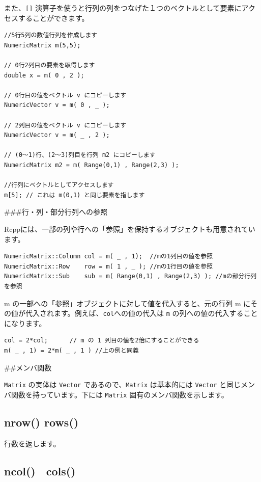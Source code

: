 \documentclass[]{book}
\begin{document}
また、\texttt{{[}{]}} 演算子を使うと行列の列をつなげた１つのベクトルとして要素にアクセスすることができます。

\begin{verbatim}
//5行5列の数値行列を作成します
NumericMatrix m(5,5);

// 0行2列目の要素を取得します
double x = m( 0 , 2 );

// 0行目の値をベクトル v にコピーします
NumericVector v = m( 0 , _ );

// 2列目の値をベクトル v にコピーします
NumericVector v = m( _ , 2 );

// (0〜1)行、(2〜3)列目を行列 m2 にコピーします
NumericMatrix m2 = m( Range(0,1) , Range(2,3) );

//行列にベクトルとしてアクセスします
m[5]; // これは m(0,1) と同じ要素を指します
\end{verbatim}

\#\#\#行・列・部分行列への参照

Rcppには、一部の列や行への「参照」を保持するオブジェクトも用意されています。

\begin{verbatim}
NumericMatrix::Column col = m( _ , 1);  //mの1列目の値を参照
NumericMatrix::Row    row = m( 1 , _ ); //mの1行目の値を参照
NumericMatrix::Sub    sub = m( Range(0,1) , Range(2,3) ); //mの部分行列を参照
\end{verbatim}

m の一部への「参照」オブジェクトに対して値を代入すると、元の行列 m にその値が代入されます。例えば、\texttt{col}への値の代入は \texttt{m} の列への値の代入することになります。

\begin{verbatim}
col = 2*col;      // m の 1 列目の値を2倍にすることができる
m( _ , 1) = 2*m( _ , 1 ) //上の例と同義
\end{verbatim}

\#\#メンバ関数

\texttt{Matrix} の実体は \texttt{Vector} であるので、\texttt{Matrix} は基本的には \texttt{Vector} と同じメンバ関数を持っています。下には \texttt{Matrix} 固有のメンバ関数を示します。

\hypertarget{nrow-rows}{%
\subsection{nrow() rows()}\label{nrow-rows}}

行数を返します。

\hypertarget{ncolcols}{%
\subsection{ncol()　cols()}\label{ncolcols}}
\end{document}
